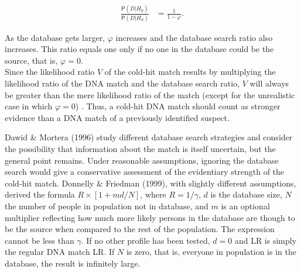 \documentclass[10pt,dvipsnames,enabledeprecatedfontcommands]{scrartcl}
\newcommand{\pr}[1]{\mathsf{P}(#1)}
\begin{document}
\begin{align*}
\frac{\pr{D\vert H_p}}{\pr{D\vert H_d}} & = \frac{1}{1-\varphi}.
\end{align*}

\noindent As the database gets larger, \(\varphi\) increases and the
database search ratio also increases. This ratio equals one only if no
one in the database could be the source, that is, \(\varphi=0\).\\
Since the likelihood ratio \(V\) of the cold-hit match results by
multiplying the likelihood ratio of the DNA match and the database
search ratio, \(V\) will always be greater than the mere likelihood
ratio of the match (except for the unrealistic case in which
\(\varphi=0\)) . Thus, a cold-hit DNA match should count as stronger
evidence than a DNA match of a previously identified suspect.

Dawid \& Mortera (1996) study different database search strategies and
consider the possibility that information about the match is itself
uncertain, but the general point remains. Under reasonable assumptions,
ignoring the database search would give a conservative assessment of the
evidentiary strength of the cold-hit match. Donnelly \& Friedman (1999),
with slightly different assumptions, derived the formula
\(R \times [1+md/N]\), where \(R = 1/\gamma\), \(d\) is the database
size, \(N\) the number of people in population not in database, and
\(m\) is an optional multiplier reflecting how much more likely persons
in the database are though to be the source when compared to the rest of
the population. The expression cannot be less than \(\gamma\). If no
other profile has been tested, \(d=0\) and LR is simply the regular DNA
match LR. If \(N\) is zero, that is, everyone in population is in the
database, the result is infinitely large.
\end{document}
